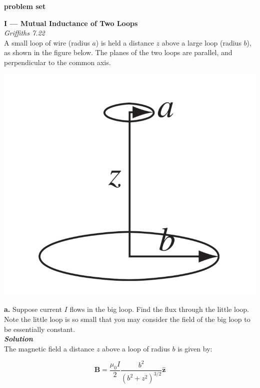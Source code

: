 \documentclass[9pt]{extarticle}
\renewcommand{\v}[1]{{\bm #1}}
\newcommand{\hv}[1]{\hat{\bm{#1}}}
\newcommand{\bfit}[1]{\textbf{\textit{#1}}}
\newcommand{\muo}{\mu_0}
\begin{document}
\setlength{\parindent}{0pt}

{\huge \bf problem set} 

\noindent \hrulefill

\begin{multicols*}{2}

{\bf \LARGE I --- Mutual Inductance of Two Loops} \\

{\it Griffiths 7.22} \\ 

A small loop of wire (radius $a$) is held a distance $z$ above a large loop (radius $b$), as shown in the figure below. The planes of the two loops are parallel, and perpendicular to the common axis.    

\begin{center}
	\includegraphics[scale=0.2]{ps8-pic1.png}
\end{center}

{\bf \Large a.} Suppose current $I$ flows in the big loop.  Find the flux through the little loop.  Note the little loop is so small that you may consider the field of the big loop to be essentially constant. \\ 

{\bfit{Solution}} \\ 

The magnetic field a distance $z$ above a loop of radius $b$ is given by:

$$\v B = \frac{\muo I}{2} \frac{b^2}{(b^2+z^2)^{3/2}} \hv z$$ \ 


\end{multicols*}
\end{document}
